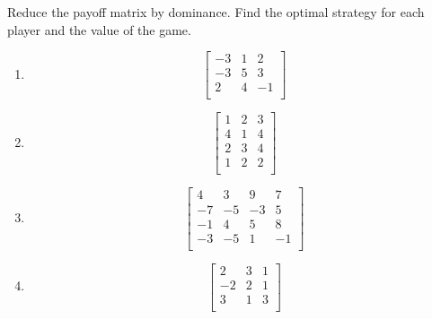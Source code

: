 \begin{puzzle}
    Reduce the payoff matrix by dominance. Find the optimal strategy for each player and the value of the game.

    \begin{enumerate}
        \item
              \[
                  \begin{bmatrix}
                      -3 & 1 & 2  \\
                      -3 & 5 & 3  \\
                      2  & 4 & -1 \\
                  \end{bmatrix}
              \]

        \item
              \[
                  \begin{bmatrix}
                      1 & 2 & 3 \\
                      4 & 1 & 4 \\
                      2 & 3 & 4 \\
                      1 & 2 & 2 \\
                  \end{bmatrix}
              \]

        \item
              \[
                  \begin{bmatrix}
                      4  & 3  & 9  & 7  \\
                      -7 & -5 & -3 & 5  \\
                      -1 & 4  & 5  & 8  \\
                      -3 & -5 & 1  & -1 \\
                  \end{bmatrix}
              \]

        \item
              \[
                  \begin{bmatrix}
                      2  & 3 & 1 \\
                      -2 & 2 & 1 \\
                      3  & 1 & 3 \\
                  \end{bmatrix}
              \]


\end{enumerate}
\end{puzzle}
